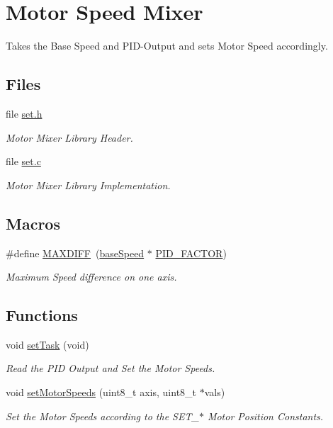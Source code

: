 \hypertarget{group__set}{\section{Motor Speed Mixer}
\label{group__set}
}


Takes the Base Speed and P\-I\-D-\/\-Output and sets Motor Speed accordingly.  


\subsection*{Files}
\begin{DoxyCompactItemize}
\item 
file \hyperlink{set_8h}{set.\-h}
\begin{DoxyCompactList}\small\item\em Motor Mixer Library Header. \end{DoxyCompactList}\item 
file \hyperlink{set_8c}{set.\-c}
\begin{DoxyCompactList}\small\item\em Motor Mixer Library Implementation. \end{DoxyCompactList}\end{DoxyCompactItemize}
\subsection*{Macros}
\begin{DoxyCompactItemize}
\item 
\#define \hyperlink{group__set_ga3d4060e583ff657db3505ec8933d9b12}{M\-A\-X\-D\-I\-F\-F}~(\hyperlink{group__set_gab2b0c78a81e045d7a8f28be307b8c61b}{base\-Speed} $\ast$ \hyperlink{group__config_ga0eb032986beceb6759aebd761c35a879}{P\-I\-D\-\_\-\-F\-A\-C\-T\-O\-R})
\begin{DoxyCompactList}\small\item\em Maximum Speed difference on one axis. \end{DoxyCompactList}\end{DoxyCompactItemize}
\subsection*{Functions}
\begin{DoxyCompactItemize}
\item 
void \hyperlink{group__set_ga37f245c493d725009017f62a78505e64}{set\-Task} (void)
\begin{DoxyCompactList}\small\item\em Read the P\-I\-D Output and Set the Motor Speeds. \end{DoxyCompactList}\item 
void \hyperlink{group__set_ga4173baf06c19647e0c60ef2e910bbc87}{set\-Motor\-Speeds} (uint8\-\_\-t axis, uint8\-\_\-t $\ast$vals)
\begin{DoxyCompactList}\small\item\em Set the Motor Speeds according to the S\-E\-T\-\_\-$\ast$ Motor Position Constants. \end{DoxyCompactList}\end{DoxyCompactItemize}
